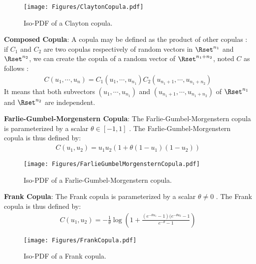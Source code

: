 {  \begin{figure}[H]
    \begin{center}
      \texttt{[image: Figures/ClaytonCopula.pdf]}
      \caption{Iso-PDF of a  Clayton copula.}
    \end{center}
  \end{figure}


  {\bf Composed Copula}:
  A copula may be defined as the product of other copulas : if $C_1$ and $C_2$ are two copulas respectively of random vectors in  $\Rset^{n_1}$ and $\Rset^{n_2}$, we can create the copula of a random vector of $\Rset^{n_1+n_2}$, noted $C$ as follows :
  \begin{align*}
    C(u_1, \cdots, u_n) = C_1(u_1, \cdots, u_{n_1}) C_2(u_{n_1+1}, \cdots, u_{n_1+n_2})
  \end{align*}
  It means that both subvectors $(u_1, \cdots, u_{n_1})$ and $(u_{n_1+1}, \cdots, u_{n_1+n_2})$ of $\Rset^{n_1}$ and $\Rset^{n_2}$ are independent.




  {\bf Farlie-Gumbel-Morgenstern Copula}: The Farlie-Gumbel-Morgenstern copula is parameterized by a scalar $\theta \in [-1,1] $ . The Farlie-Gumbel-Morgenstern copula is thus defined by:
  \begin{align*}
    C(u_1, u_2) =\displaystyle u_1u_2 (1 + \theta(1 - u_1)(1 - u_2))
  \end{align*}



  \begin{figure}[H]
    \begin{center}
      \texttt{[image: Figures/FarlieGumbelMorgensternCopula.pdf]}
      \caption{Iso-PDF of a  Farlie-Gumbel-Morgenstern copula.}
    \end{center}
  \end{figure}


  {\bf Frank Copula}: The Frank copula is parameterized by a scalar $\theta \neq 0 $  . The Frank copula is thus defined by:
  \begin{align*}
    C(u_1, u_2) =\displaystyle -\frac{1}{\theta}\log\left(1+\frac{(e^{-\theta u_1}-1)(e^{-\theta u_2}-1}{e^{-\theta}-1}\right)
  \end{align*}




  \begin{figure}[H]
    \begin{center}
      \texttt{[image: Figures/FrankCopula.pdf]}
    \end{center}
    \caption{Iso-PDF of a Frank copula.}
  \end{figure}



}
